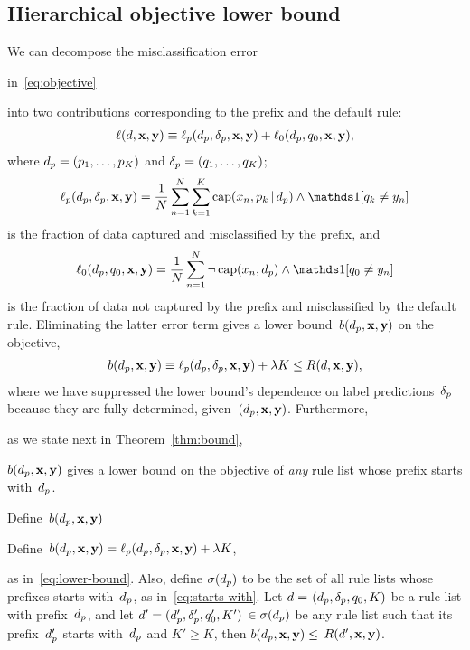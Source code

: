 \subsection{Hierarchical objective lower bound}
\label{sec:hierarchical}

We can decompose the misclassification error
\begin{arxiv}
in~\eqref{eq:objective}
\end{arxiv}
into two contributions corresponding to the prefix and the default rule:
\begin{align*}
\Loss(\RL, \x, \y) %
\equiv \Loss_p(\Prefix, \Labels, \x, \y) + \Loss_0(\Prefix, \Default, \x, \y),
\end{align*}
where ${d_p = (p_1, \dots, p_K)}$ and ${\delta_p = (q_1, \dots, q_K)}$;
\begin{align*}
\Loss_p(\Prefix, \Labels, \x, \y) =
\frac{1}{N} \sum_{n=1}^N \sum_{k=1}^K \Cap(x_n, p_k \given \Prefix) \wedge \one [ q_k \neq y_n ]
\end{align*}
is the fraction of data captured and misclassified by the prefix, and
\begin{align*}
\Loss_0(\Prefix, \Default, \x, \y) =
\frac{1}{N} \sum_{n=1}^N \neg\, \Cap(x_n, \Prefix) \wedge \one [ \Default \neq y_n ]
\end{align*}
is the fraction of data not captured by the prefix and misclassified by the default rule.
%
Eliminating the latter error term gives a lower bound~$b(d_p, \mathbf{x}, \mathbf{y})$ on the objective,
\begin{align}
b(d_p, \mathbf{x}, \mathbf{y}) \equiv \ell_p(d_p, \delta_p, \mathbf{x}, \mathbf{y}) + {\lambda} K \le R({d}, \mathbf{x}, \mathbf{y}),
\label{eq:lower-bound}
\end{align}
where we have suppressed the lower bound's dependence on label predictions~$\delta_p$
because they are fully determined, given~${(d_p, \mathbf{x}, \mathbf{y})}$.
%
Furthermore,
\begin{arxiv}
as we state next in Theorem~\ref{thm:bound},
\end{arxiv}
$b(d_p, \mathbf{x}, \mathbf{y})$ gives a lower bound on the objective of
\emph{any} rule list whose prefix starts with~$d_p$.

\begin{theorem}
\begin{arxiv}
Define~${b(d_p, \mathbf{x}, \mathbf{y})}$
\end{arxiv}
\begin{kdd}
Define~${b(d_p, \mathbf{x}, \mathbf{y}) = \ell_p(d_p, \delta_p, \mathbf{x}, \mathbf{y}) + {\lambda} K}$,
\end{kdd}
as in~\eqref{eq:lower-bound}.
%
Also, define $\sigma(d_p)$ to be the set of all rule lists
whose prefixes starts with~$d_p$, as in~\eqref{eq:starts-with}.
%
Let ${{d} = }$ ${(d_p, \delta_p, q_0, K)}$ be a rule list
with prefix~$d_p$, and let
${{d}' = (d_p', \delta_p', q_0', K')}$ $\in \sigma(d_p)$
be any rule list such that its prefix~$d_p'$ starts with~$d_p$
and ${K' \ge K}$, then ${b(d_p, \mathbf{x}, \mathbf{y}) \le}$ ${R({d}', \mathbf{x}, \mathbf{y})}$.
\label{thm:bound}
\end{theorem}

